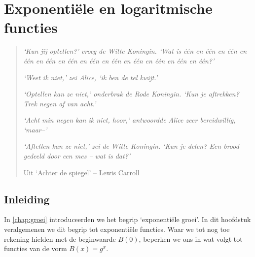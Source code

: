 %                   
%                 
%                       
%    
%     


\chapter{Exponenti\"ele en logaritmische functies}
\label{chap:expFunctie}


\begin{quote}
     \textit{ `Kun jij optellen?' vroeg de Witte Koningin.
     `Wat is \'{e}\'{e}n en \'{e}\'{e}n en \'{e}\'{e}n en \'{e}\'{e}n
     en \'{e}\'{e}n en \'{e}\'{e}n en \'{e}\'{e}n en \'{e}\'{e}n en
     \'{e}\'{e}n en \'{e}\'{e}n en \'{e}\'{e}n en \'{e}\'{e}n?'}

     \textit{`Weet ik niet,' zei Alice, `ik ben de tel kwijt.'}

     \textit{`Optellen kan ze niet,' onderbrak de Rode Koningin. `Kun je
          aftrekken? Trek negen af van acht.'}

     \textit{`Acht min negen kan ik niet, hoor,' antwoordde Alice zeer
          bereidwillig, `maar--'}

     \textit{`Aftellen kan ze niet,' zei de Witte Koningin. `Kun je delen? Een
          brood gedeeld door een mes -- wat is \emph{dat}?'}

          Uit `Achter de spiegel' -- Lewis Carroll
\end{quote}


\newpage
\section{Inleiding}
In \cref{chap:groei} introduceerden we het begrip `exponentiële groei'. In dit hoofdstuk veralgemenen we dit begrip tot exponentiële functies. Waar we tot nog toe rekening hielden met de beginwaarde $B(0)$, beperken we ons in wat volgt tot functies van de vorm $B(x)=g^x$. 

